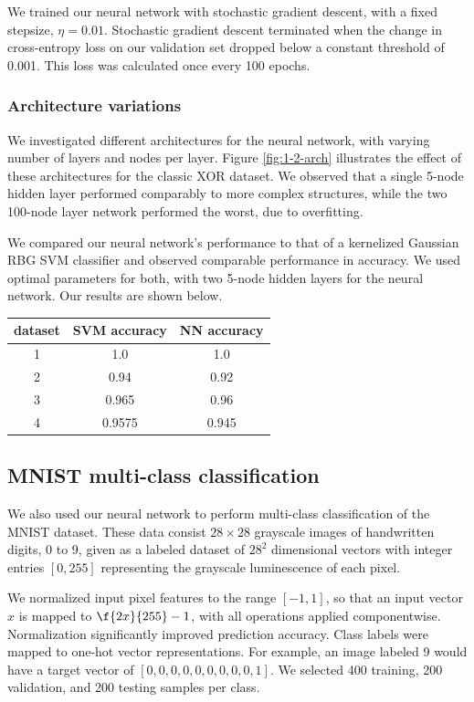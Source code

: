 \documentclass{article}
\begin{document}
\begin{multicols}{2}
We trained our neural network with stochastic gradient descent, with a 
fixed stepsize, $\eta = 0.01$. Stochastic gradient descent terminated when
the change in cross-entropy loss on our validation set dropped below a constant threshold of 0.001.
This loss was calculated once every 100 epochs.


\subsubsection{Architecture variations}
\label{sec:binaryarch}
We investigated different architectures for the neural network,
with varying number of layers and nodes per layer.
Figure \ref{fig:1-2-arch} illustrates the effect of these architectures
for the classic XOR dataset.
We observed that a single 5-node hidden layer performed comparably to
more complex structures, while the two 100-node layer network performed the
worst, due to overfitting.

We compared our neural network's performance to that of a kernelized
Gaussian RBG SVM classifier and observed comparable performance in accuracy.
We used optimal parameters for both, with two 5-node hidden layers
for the neural network. Our results are shown below.

\begin{center}
\begin{tabular}{c|c|c}
dataset & SVM accuracy	& NN accuracy \\\hline
        1	& 1.0 & 1.0\\
        2	& 0.94 & 0.92 \\
        3	& 0.965 & 0.96 \\
        4	& 0.9575 & 0.945
\end{tabular}
\end{center}

\subsection{MNIST multi-class classification}

We also used our neural network to perform multi-class classification of the
MNIST dataset. These data consist $28\times 28$ grayscale images of handwritten
digits, 0 to 9, given as a labeled dataset of $28^2$ dimensional vectors
with integer entries $[0,255]$ representing the grayscale luminescence of each pixel.

We normalized input pixel features to the range $[-1, 1]$,
so that an input vector $x$ is mapped to $\f{2x}{255}-1$,
with all operations applied componentwise. Normalization significantly
improved prediction accuracy. Class labels were mapped to one-hot vector 
representations. For example, an image labeled 9 would have a 
target vector of $[0,0,0,0,0,0,0,0,0,1]$.
We selected 400 training, 200 validation, and 200 testing samples per class.


\end{multicols}
\end{document}
